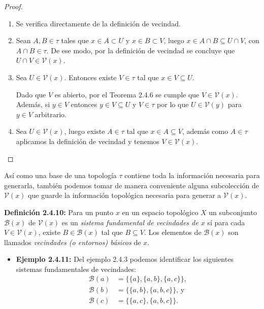 \begin{proof} $$$$
\begin{enumerate}
    \item Se verifica directamente de la definición de vecindad. 
    \item Sean $A,B\in\tau$ tales que $x\in A\subset U$ y $x\in B\subset V$, luego $x\in A\cap B\subseteq U\cap V$, con $A\cap B\in\tau$. De ese modo, por la definición de vecindad se concluye que $U\cap V\in\mathcal{V}(x)$.
    \item Sea $U\in\mathcal{V}(x)$. Entonces existe $V\in\tau$ tal que $x\in V\subseteq U$.
    
    Dado que $V$ es abierto, por el Teorema 2.4.6 se cumple que $V\in\mathcal{V}(x)$. Además, si $y\in V$ entonces $y\in V\subseteq U$ y $V\in\tau$ por lo que $U\in\mathcal{V}(y)$ para $y\in V$ arbitrario.
    \item Sea $U\in\mathcal{V}(x)$, luego existe $A\in\tau$ tal que $x\in A\subseteq V$, además como $A\in\mathcal{\tau}$ aplicamos la definición de vecindad y tenemos $V\in\mathcal{V}(x)$.
\end{enumerate} 
\end{proof}

Así como una base de una topología $\tau$ contiene toda la información necesaria para generarla, también podemos tomar de manera conveniente alguna subcolección de $\mathcal{V}(x)$ que guarde la información topológica necesaria para generar a $\mathcal{V}(x)$.

\textbf{Definición 2.4.10:} Para un punto $x$ en un espacio topológico $X$ un subconjunto $\mathcal{B}(x)$ de $\mathcal{V}(x)$ es un \textit{sistema fundamental de vecindades de $x$} sí para cada $V\in\mathcal{V}(x)$, existe $B\in\mathcal{B}(x)$ tal que $B\subseteq V$. Los elementos de $\mathcal{B}(x)$ son llamados \textit{vecindades (o entornos) básicos} de $x$.

\begin{itemize}
    \item \textbf{Ejemplo 2.4.11:} Del ejemplo 2.4.3 podemos identificar los siguientes sistemas fundamentales de vecindades:
    \begin{align*}
        \mathcal{B}(a) &= \{\{a\},\{a,b\},\{a,c\}\},\\
        \mathcal{B}(b) &= \{\{a,b\},\{a,b,c\}\}\text{, y }\\
        \mathcal{B}(c) &= \{\{a,c\},\{a,b,c\}\}.
    \end{align*}
\end{itemize}

